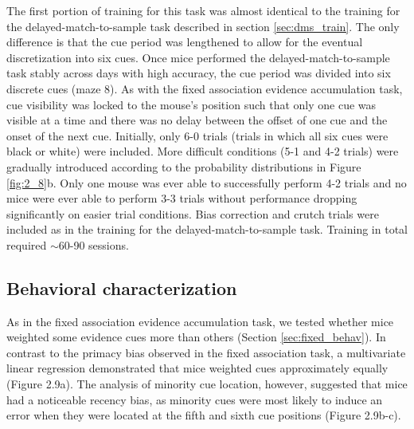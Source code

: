 The first portion of training for this task was almost identical to the training for the delayed-match-to-sample task described in section \ref{sec:dms_train}. The only difference is that the cue period was lengthened to allow for the eventual discretization into six cues. Once mice performed the delayed-match-to-sample task stably across days with high accuracy, the cue period was divided into six discrete cues (maze 8). As with the fixed association evidence accumulation task, cue visibility was locked to the mouse’s position such that only one cue was visible at a time and there was no delay between the offset of one cue and the onset of the next cue. Initially, only 6-0 trials (trials in which all six cues were black or white) were included. More difficult conditions (5-1 and 4-2 trials) were gradually introduced according to the probability distributions in Figure \ref{fig:2_8}b. Only one mouse was ever able to successfully perform 4-2 trials and no mice were ever able to perform 3-3 trials without performance dropping significantly on easier trial conditions. Bias correction and crutch trials were included as in the training for the delayed-match-to-sample task. Training in total required $\sim$60-90 sessions. 

\subsection{Behavioral characterization} \label{sec:dms_int_behav}

As in the fixed association evidence accumulation task, we tested whether mice weighted some evidence cues more than others (Section \ref{sec:fixed_behav}). In contrast to the primacy bias observed in the fixed association task, a multivariate linear regression demonstrated that mice weighted cues approximately equally (Figure 2.9a). The analysis of minority cue location, however, suggested that mice had a noticeable recency bias, as minority cues were most likely to induce an error when they were located at the fifth and sixth cue positions (Figure 2.9b-c). 


